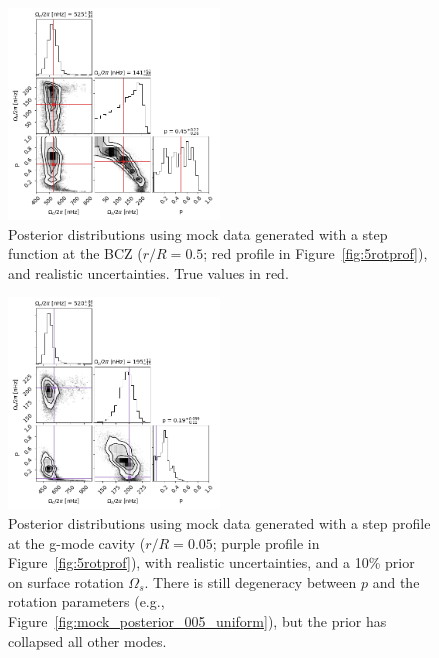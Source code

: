 \begin{figure}[h]
\centering
    \includegraphics[width=0.5\textwidth]{Figures/subgiant_chapter_figures/10.5_corner.png}
    \caption{Posterior distributions using mock data generated with a step function at the BCZ ($r/R = 0.5$; red profile in Figure~\ref{fig:5rotprof}), and realistic uncertainties. True values in red.}
    \label{fig:mock_posterior_050_uniform}
\end{figure}

\begin{figure}[h]
\centering
    \includegraphics[width=0.5\textwidth]{Figures/subgiant_chapter_figures/20.05_corner.png}
    \caption{Posterior distributions using mock data generated with a step profile at the g-mode cavity ($r/R = 0.05$; purple profile in Figure~\ref{fig:5rotprof}), with realistic uncertainties, and a 10\% prior on surface rotation $\Omega_s$. There is still degeneracy between $p$ and the rotation parameters (e.g., Figure~\ref{fig:mock_posterior_005_uniform}), but the prior has collapsed all other modes.}
    \label{fig:mock_posterior_005_reject}
\end{figure}

